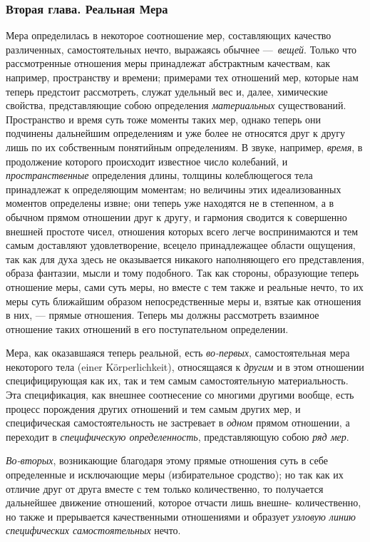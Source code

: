 \subsubsection{Вторая глава. Реальная Мера}
Мера определилась в некоторое соотношение мер,
составляющих качество различенных, самостоятельных нечто, выражаясь обычнее
—~{\em вещей}. Только что рассмотренные отношения меры
принадлежат абстрактным качествам, как например, пространству и времени;
примерами тех отношений мер, которые нам теперь предстоит рассмотреть,
служат удельный вес и, далее, химические свойства, представляющие собою
определения {\em материальных} существований.
Пространство и время суть тоже моменты таких мер, однако теперь они
подчинены дальнейшим определениям и уже более не относятся друг к другу
лишь по их собственным понятийным определениям. В звуке, например,
{\em время}, в продолжение которого происходит
известное число колебаний, и {\em пространственные}
определения длины, толщины колеблющегося тела принадлежат к определяющим
моментам; но величины этих идеализованных моментов определены извне; они
теперь уже находятся не в степенном, а в обычном прямом отношении друг к
другу, и гармония сводится к совершенно внешней простоте чисел, отношения
которых всего легче воспринимаются и тем самым доставляют удовлетворение,
всецело принадлежащее области ощущения, так как для духа здесь не
оказывается никакого наполняющего его представления, образа фантазии, мысли
и тому подобного. Так как стороны, образующие теперь отношение меры, сами
суть меры, но вместе с тем также и реальные нечто, то их меры суть
ближайшим образом непосредственные меры и, взятые как отношения в них, —
прямые отношения. Теперь мы должны рассмотреть взаимное отношение таких
отношений в его поступательном определении.

Мера, как оказавшаяся теперь реальной, есть
{\em во-первых}, самостоятельная мера некоторого тела
(einer Körperlichkeit), относящаяся к {\em другим} и в
этом отношении специфицирующая как их, так и тем самым самостоятельную
материальность. Эта спецификация, как внешнее соотнесение со многими
другими вообще, есть процесс порождения других отношений и тем самым других
мер, и специфическая самостоятельность не застревает в
{\em одном} прямом отношении, а переходит в
{\em специфическую определенность}, представляющую
собою {\em ряд мер}.

{\em Во-вторых}, возникающие благодаря этому прямые
отношения суть в себе определенные и исключающие меры (избирательное
сродство); но так как их отличие друг от друга вместе с тем только
количественно, то получается дальнейшее движение отношений, которое отчасти
лишь внешне- количественно, но также и прерывается качественными
отношениями и образует {\em узловую линию специфических
самостоятельных} нечто.

